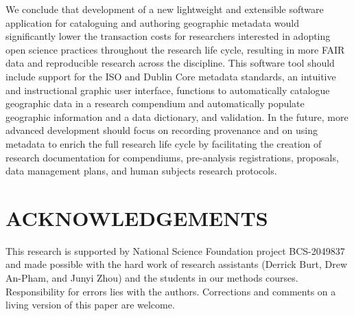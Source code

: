 \documentclass{isprs} %
\begin{document}
We conclude that development of a new lightweight and extensible software application for cataloguing and authoring geographic metadata would significantly lower the transaction costs for researchers interested in adopting open science practices throughout the research life cycle, resulting in more FAIR data and reproducible research across the discipline. 
This software tool should include support for the ISO and Dublin Core metadata standards, an intuitive and instructional graphic user interface, functions to automatically catalogue geographic data in a research compendium and automatically populate geographic information and a data dictionary, and validation.
In the future, more advanced development should focus on recording provenance and on using metadata to enrich the full research life cycle by facilitating the creation of research documentation for compendiums, pre-analysis registrations, proposals, data management plans, and human subjects research protocols.


\section*{ACKNOWLEDGEMENTS}\label{ACKNOWLEDGEMENTS}
This research is supported by National Science Foundation project BCS-2049837 and made possible with the hard work of research assistants (Derrick Burt, Drew An-Pham, and Junyi Zhou) and the students in our methods courses.
Responsibility for errors lies with the authors. Corrections and comments on a living version of this paper \citep{foss4g2022} are welcome.

{
	\begin{spacing}{1.17}
		\normalsize
		 
	\end{spacing}
}
\end{document}
